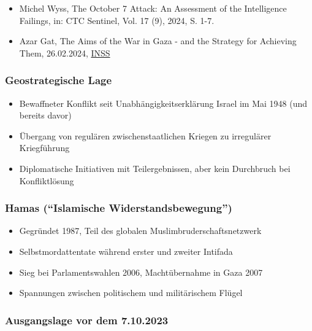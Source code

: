{}\documentclass[a4paper]{article}
\providecommand{\tightlist}{\setlength{\itemsep}{1mm}\setlength{\parskip}{1mm}}
\begin{document}
\begin{itemize}
	\tightlist
	\item
	      Michel Wyss, The October 7 Attack: An Assessment of the Intelligence
	      Failings, in: CTC Sentinel, Vol. 17 (9), 2024, S. 1-7.
	\item
	      Azar Gat, The Aims of the War in Gaza - and the Strategy for Achieving
	      Them, 26.02.2024,
	      \href{https://www.inss.org.il/publication/gaza-war-targets/}{INSS}
\end{itemize}

\subsubsection{Geostrategische Lage}\label{geostrategische-lage}

\begin{itemize}
	\tightlist
	\item
	      Bewaffneter Konflikt seit Unabhängigkeitserklärung Israel im Mai 1948
	      (und bereits davor)
	\item
	      Übergang von regulären zwischenstaatlichen Kriegen zu irregulärer
	      Kriegführung
	\item
	      Diplomatische Initiativen mit Teilergebnissen, aber kein Durchbruch
	      bei Konfliktlösung
\end{itemize}

\subsubsection{Hamas (``Islamische
	Widerstandsbewegung'')}\label{hamas-islamische-widerstandsbewegung}

\begin{itemize}
	\tightlist
	\item
	      Gegründet 1987, Teil des globalen Muslimbruderschaftsnetzwerk
	\item
	      Selbstmordattentate während erster und zweiter Intifada
	\item
	      Sieg bei Parlamentswahlen 2006, Machtübernahme in Gaza 2007
	\item
	      Spannungen zwischen politischem und militärischem Flügel
\end{itemize}

\subsubsection{Ausgangslage vor dem
	7.10.2023}\label{ausgangslage-vor-dem-7.10.2023}
\end{document}
